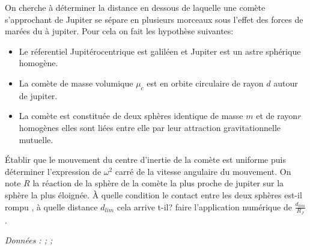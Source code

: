\begin{Exercise}[title=(*) Limite de Roche]
On cherche à déterminer la distance en dessous de laquelle une comète s'approchant de Jupiter se sépare en plusieurs morceaux sous l'effet des forces de marées du à jupiter. Pour cela on fait les hypothèse suivantes:
\begin{itemize}
	\item Le réferentiel Jupitérocentrique est galiléen et Jupiter est un astre sphérique homogène.
	\item La comète de masse volumique $\mu_c$ est en orbite circulaire de rayon $d$ autour de jupiter.
	\item La comète est constituée de deux sphères identique de masse $m$ et de rayon$r$ homogènes elles sont liées entre elle par leur attraction gravitationnelle mutuelle.
    \end{itemize}
    \begin{center}
    \end{center}
\Question Établir que le mouvement du centre d'inertie de la comète est uniforme puis déterminer l'expression de $\omega^2$ carré de la vitesse angulaire du mouvement.
\Question On note $R$ la réaction de la sphère  de la comète la plus proche de jupiter sur la sphère la plus éloignée. À quelle condition le contact entre les deux sphères est-il rompu , à quelle distance $d_{lim}$ cela arrive t-il?
\Question faire l'application numérique de $\frac{d_{lim}}{R_J}$.

\emph{Données : ; ; }
\end{Exercise}
